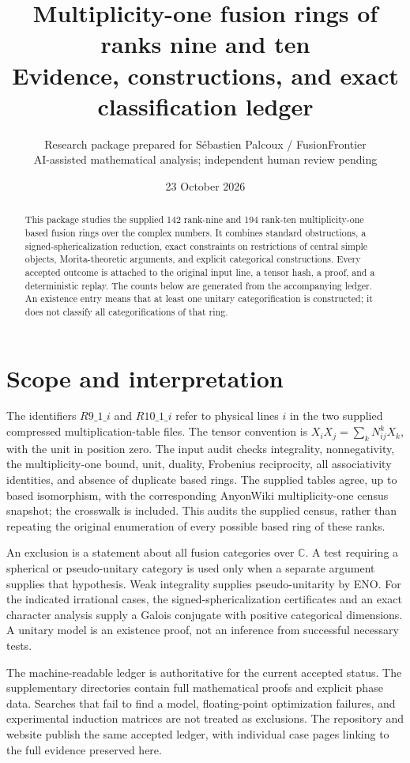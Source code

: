 \documentclass[11pt]{article}
\title{Multiplicity-one fusion rings of ranks nine and ten\\\large Evidence, constructions, and exact classification ledger}
\author{Research package prepared for S\'ebastien Palcoux / FusionFrontier\\\small AI-assisted mathematical analysis; independent human review pending}
\date{23 October 2026}
\newcommand{\C}{\mathbb C}
\begin{document}
\maketitle
\begin{abstract}
This package studies the supplied 142 rank-nine and 194 rank-ten
multiplicity-one based fusion rings over the complex numbers. It combines
standard obstructions, a signed-sphericalization reduction, exact constraints
on restrictions of central simple objects, Morita-theoretic arguments, and
explicit categorical constructions. Every accepted outcome is attached to
the original input line, a tensor hash, a proof, and a deterministic replay.
The counts below are generated from the accompanying ledger. An existence
entry means that at least one unitary categorification is constructed; it
does not classify all categorifications of that ring.
\end{abstract}

\newpage
{\small\tableofcontents}
\newpage
\section{Scope and interpretation}
The identifiers $R9\_1\_i$ and $R10\_1\_i$ refer to physical lines $i$ in
the two supplied compressed multiplication-table files. The tensor convention
is $X_iX_j=\sum_kN_{ij}^{k}X_k$, with the unit in position zero.
The input audit checks integrality, nonnegativity, the multiplicity-one bound,
unit, duality, Frobenius reciprocity, all associativity identities, and absence
of duplicate based rings. The supplied tables agree, up to based isomorphism,
with the corresponding AnyonWiki multiplicity-one census snapshot; the
crosswalk is included. This audits the supplied census, rather than repeating
the original enumeration of every possible based ring of these ranks.

An exclusion is a statement about all fusion categories over $\C$. A test
requiring a spherical or pseudo-unitary category is used only when a separate
argument supplies that hypothesis. Weak integrality supplies pseudo-unitarity
by ENO. For the indicated irrational cases, the signed-sphericalization
certificates and an exact character analysis supply a Galois conjugate with
positive categorical dimensions. A unitary model is an existence proof,
not an inference from successful necessary tests.

The machine-readable ledger is authoritative for the current accepted status.
The supplementary directories contain full mathematical proofs and explicit
phase data. Searches that fail to find a model, floating-point optimization
failures, and experimental induction matrices are not treated as exclusions.
The repository and website publish the same accepted ledger, with individual
case pages linking to the full evidence preserved here.
\end{document}
